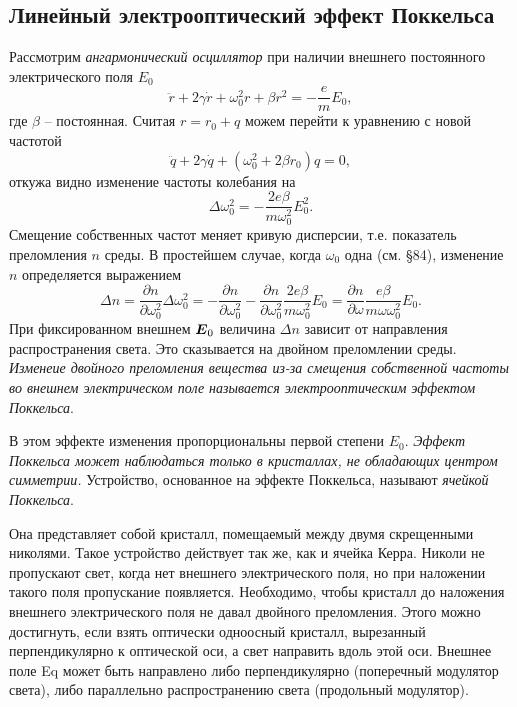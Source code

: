 \subsection{Линейный электрооптический эффект Поккельса}


Рассмотрим \textit{ангармонический осциллятор}  при наличии внешнего постоянного электрического поля $E_0$ 
\begin{equation*}
    \ddot{r} + 2 \gamma \dot{r} + \omega_0^2 r + \beta r^2 = -\frac{e}{m}E_0,
\end{equation*}
где $\beta$ -- постоянная. Считая $r = r_0 + q$ можем перейти к уравнению с новой частотой
\begin{equation*}
    \ddot{q} + 2 \gamma \dot{q} + (\omega_0^2+ 2\beta r_0) q =0,
\end{equation*}
откужа видно изменение частоты колебания на 
\begin{equation*}
    \Delta \omega_0^2 = -\frac{2 e \beta}{m \omega_0^2} E_0^2.
\end{equation*}
Смещение собственных частот меняет кривую дисперсии, т.е. показатель преломления $n$ среды. В простейшем случае, когда $\omega_0$ одна (см. \S 84), изменение $n$ определяется выражением
\begin{equation*}
    \Delta n = \frac{\partial n}{\partial \omega_0^2} \Delta \omega_0^2 = - \frac{\partial n}{\partial \omega_0^2} 
    - \frac{\partial n}{\partial \omega_0^2} \frac{2e\beta}{m \omega_0^2} E_0 = 
    \frac{\partial n}{\partial \omega} \frac{e\beta}{m \omega \omega_0^2} E_0.
\end{equation*}
При фиксированном внешнем $\mbox{\boldmath $E$}_0$ величина $\Delta n$ зависит от направления распространения света.
Это сказывается на двойном преломлении среды. \textit{Изменеие двойного преломления вещества из-за смещения собственной частоты во внешнем электрическом поле называется электрооптическим эффектом Поккельса}.

В этом эффекте изменения пропорциональны первой степени $E_0$. \textit{Эффект Поккельса может наблюдаться только в 
кристаллах, не обладающих центром симметрии.} Устройство, основанное на эффекте Поккельса, называют \textit{ячейкой Поккельса}. 

Она представляет собой кристалл, помещаемый между двумя скрещенными николями. 
Такое устройство действует так же, как и ячейка Керра. Николи
не пропускают свет, когда нет внешнего электрического поля,
но при наложении такого поля пропускание появляется. 
Необходимо, чтобы кристалл до наложения внешнего электрического
поля не давал двойного преломления. Этого можно достигнуть,
если взять оптически одноосный кристалл, вырезанный 
перпендикулярно к оптической оси, а свет направить вдоль этой оси.
Внешнее поле Eq может быть направлено либо перпендикулярно
(поперечный модулятор света), либо параллельно 
распространению света (продольный модулятор).



